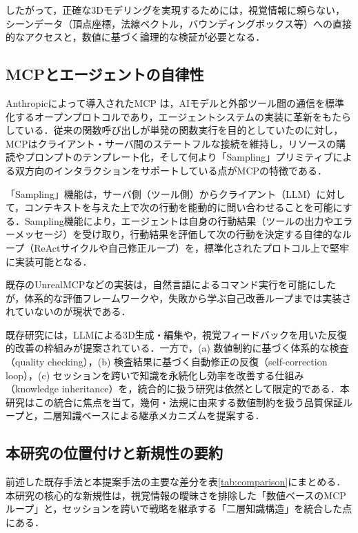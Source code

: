 \documentclass[dvipdfmx, a4paper, 9pt]{deimj}
\begin{document}
したがって，正確な3Dモデリングを実現するためには，視覚情報に頼らない，シーンデータ（頂点座標，法線ベクトル，バウンディングボックス等）への直接的なアクセスと，数値に基づく論理的な検証が必要となる．

\subsection{MCPとエージェントの自律性}

Anthropicによって導入されたMCP\cite{anthropic2024mcp} は，AIモデルと外部ツール間の通信を標準化するオープンプロトコルであり，エージェントシステムの実装に革新をもたらしている．従来の関数呼び出しが単発の関数実行を目的としていたのに対し\cite{schick2024toolformer}，MCPはクライアント・サーバ間のステートフルな接続を維持し，リソースの購読やプロンプトのテンプレート化，そして何より「Sampling」プリミティブによる双方向のインタラクションをサポートしている点がMCPの特徴である．

「Sampling」機能は，サーバ側（ツール側）からクライアント（LLM）に対して，コンテキストを与えた上で次の行動を能動的に問い合わせることを可能にする．Sampling機能により，エージェントは自身の行動結果（ツールの出力やエラーメッセージ）を受け取り，行動結果を評価して次の行動を決定する自律的なループ（ReActサイクル\cite{yao2023react}や自己修正ループ\cite{shinn2024reflexion,xi2023rise}）を，標準化されたプロトコル上で堅牢に実装可能となる．

既存のUnrealMCP\cite{unrealmcp2024}などの実装は，自然言語によるコマンド実行を可能にしたが，体系的な評価フレームワークや，失敗から学ぶ自己改善ループまでは実装されていないのが現状である．

既存研究には，LLMによる3D生成・編集や，視覚フィードバックを用いた反復的改善の枠組みが提案されている．一方で，(a) 数値制約に基づく体系的な検査（quality checking），(b) 検査結果に基づく自動修正の反復（self-correction loop），(c) セッションを跨いで知識を永続化し効率を改善する仕組み（knowledge inheritance）を，統合的に扱う研究は依然として限定的である．本研究はこの統合に焦点を当て，幾何・法規に由来する数値制約を扱う品質保証ループと，二層知識ベースによる継承メカニズムを提案する．

\subsection{本研究の位置付けと新規性の要約}

前述した既存手法と本提案手法の主要な差分を表\ref{tab:comparison}にまとめる．本研究の核心的な新規性は，視覚情報の曖昧さを排除した「数値ベースのMCPループ」と，セッションを跨いで戦略を継承する「二層知識構造」を統合した点にある．
\end{document}
